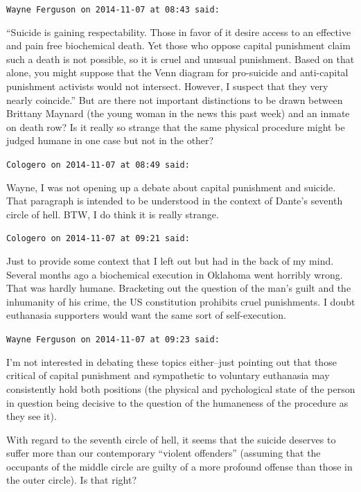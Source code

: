 \begin{footnotesize}
\begin{sffamily}
\texttt{Wayne Ferguson on 2014-11-07 at 08:43 said:} 

``Suicide is gaining respectability. Those in favor of it desire access to an effective and pain free biochemical death. Yet those who oppose capital punishment claim such a death is not possible, so it is cruel and unusual punishment. Based on that alone, you might suppose that the Venn diagram for pro-suicide and anti-capital punishment activists would not intersect. However, I suspect that they very nearly coincide.'' But are there not important distinctions to be drawn between Brittany Maynard (the young woman in the news this past week) and an inmate on death row? Is it really so strange that the same physical procedure might be judged humane in one case but not in the other?

\hfill

\texttt{Cologero on 2014-11-07 at 08:49 said:}

Wayne, I was not opening up a debate about capital punishment and suicide. That paragraph is intended to be understood in the context of Dante's seventh circle of hell. BTW, I do think it is really strange.

\hfill

\texttt{Cologero on 2014-11-07 at 09:21 said:}

Just to provide some context that I left out but had in the back of my mind. Several months ago a biochemical execution in Oklahoma went horribly wrong. That was hardly humane. Bracketing out the question of the man's guilt and the inhumanity of his crime, the US constitution prohibits cruel punishments. I doubt euthanasia supporters would want the same sort of self-execution.

\hfill

\texttt{Wayne Ferguson on 2014-11-07 at 09:23 said:}

I'm not interested in debating these topics either--just pointing out that those critical of capital punishment and sympathetic to voluntary euthanasia may consistently hold both positions (the physical and pychological state of the person in question being decisive to the question of the humaneness of the procedure as they see it).

With regard to the seventh circle of hell, it seems that the suicide deserves to suffer more than our contemporary ``violent offenders'' (assuming that the occupants of the middle circle are guilty of a more profound offense than those in the outer circle). Is that right?


\end{sffamily}
\end{footnotesize}
